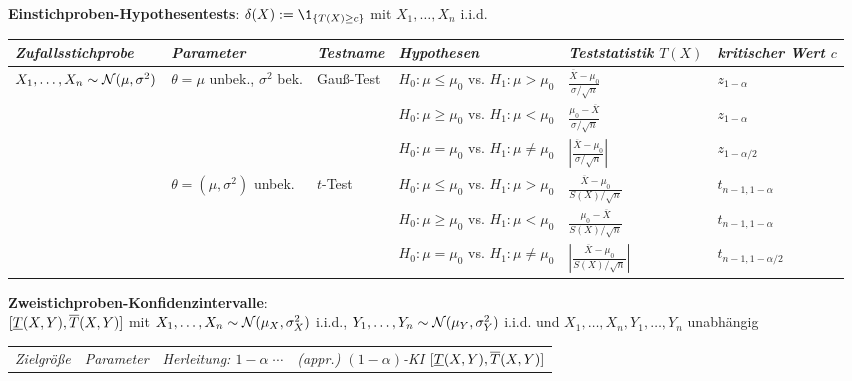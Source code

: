 \begin{landscape}
{\begin{tabular}{lllll}
    \bottomrule
\end{tabular}}

\textbf{Einstichproben-Hypothesentests}:
$\delta(X) := \1_{\{T(X) \ge c\}}$ mit $X_1, \dotsc, X_n$ i.i.d.

{\small\begin{tabular}{llllll}
    \toprule
    \emph{Zufallsstichprobe} &
    \emph{Parameter} &
    \emph{Testname} &
    \emph{Hypothesen} &
    \emph{Teststatistik $T(X)$} &
    \emph{kritischer Wert $c$}\\

    \midrule
    $X_1, \dotsc, X_n \sim \mathcal{N}(\mu, \sigma^2)$ &
    $\theta = \mu$ unbek., $\sigma^2$ bek. &
    Gauß-Test &
    $H_0\colon \mu \le \mu_0$ vs. $H_1\colon \mu > \mu_0$ &
    $\frac{\overline{X} - \mu_0}{\sigma/\sqrt{n}}$ &
    $z_{1-\alpha}$\\
    \cmidrule(r){4-6}
    &&& $H_0\colon \mu \ge \mu_0$ vs. $H_1\colon \mu < \mu_0$ &
    $\frac{\mu_0 - \overline{X}}{\sigma/\sqrt{n}}$ &
    $z_{1-\alpha}$\\
    \cmidrule(r){4-6}
    &&& $H_0\colon \mu = \mu_0$ vs. $H_1\colon \mu \not= \mu_0$ &
    $\left|\frac{\overline{X} - \mu_0}{\sigma/\sqrt{n}}\right|$ &
    $z_{1-\alpha/2}$\\
    \cmidrule(r){2-6}
    & $\theta = (\mu, \sigma^2)$ unbek. &
    $t$-Test &
    $H_0\colon \mu \le \mu_0$ vs. $H_1\colon \mu > \mu_0$ &
    $\frac{\overline{X} - \mu_0}{S(X)/\sqrt{n}}$ &
    $t_{n-1,1-\alpha}$\\
    \cmidrule(r){4-6}
    &&& $H_0\colon \mu \ge \mu_0$ vs. $H_1\colon \mu < \mu_0$ &
    $\frac{\mu_0 - \overline{X}}{S(X)/\sqrt{n}}$ &
    $t_{n-1,1-\alpha}$\\
    \cmidrule(r){4-6}
    &&& $H_0\colon \mu = \mu_0$ vs. $H_1\colon \mu \not= \mu_0$ &
    $\left|\frac{\overline{X} - \mu_0}{S(X)/\sqrt{n}}\right|$ &
    $t_{n-1,1-\alpha/2}$\\

    \bottomrule
\end{tabular}}

\pagebreak

\textbf{Zweistichproben-Konfidenzintervalle}:\\
$[\underline{T}(X, Y), \overline{T}(X, Y)]$ mit $X_1, \dotsc, X_n  \sim \mathcal{N}(\mu_X, \sigma_X^2)$ i.i.d.,
$Y_1, \dotsc, Y_n \sim \mathcal{N}(\mu_Y, \sigma_Y^2)$ i.i.d. und
$X_1, \dotsc, X_n, Y_1, \dotsc, Y_n$ unabhängig

{\small\begin{tabular}{llll}
    \toprule
    \emph{Zielgröße} &
    \emph{Parameter} &
    \emph{Herleitung: $1 - \alpha\; \cdots$} &
    \emph{(appr.) $(1-\alpha)$-KI $[\underline{T}(X, Y), \overline{T}(X, Y)]$}\\


\end{tabular}}
\end{landscape}
